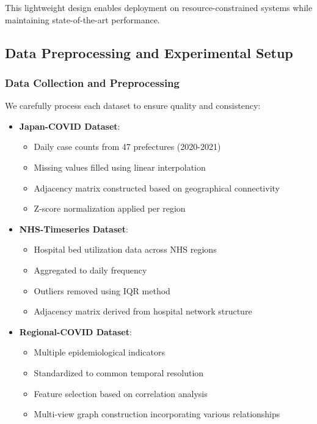 \documentclass[lettersize, journal]{IEEEtran}
\begin{document}
This lightweight design enables deployment on resource-constrained systems while maintaining state-of-the-art performance.

\subsection{Data Preprocessing and Experimental Setup}

\subsubsection{Data Collection and Preprocessing}
We carefully process each dataset to ensure quality and consistency:

\begin{itemize}
    \item \textbf{Japan-COVID Dataset}:
    \begin{itemize}
        \item Daily case counts from 47 prefectures (2020-2021)
        \item Missing values filled using linear interpolation
        \item Adjacency matrix constructed based on geographical connectivity
        \item Z-score normalization applied per region
    \end{itemize}
    
    \item \textbf{NHS-Timeseries Dataset}:
    \begin{itemize}
        \item Hospital bed utilization data across NHS regions
        \item Aggregated to daily frequency
        \item Outliers removed using IQR method
        \item Adjacency matrix derived from hospital network structure
    \end{itemize}
    
    \item \textbf{Regional-COVID Dataset}:
    \begin{itemize}
        \item Multiple epidemiological indicators
        \item Standardized to common temporal resolution
        \item Feature selection based on correlation analysis
        \item Multi-view graph construction incorporating various relationships
    \end{itemize}
\end{itemize}
\end{document}

